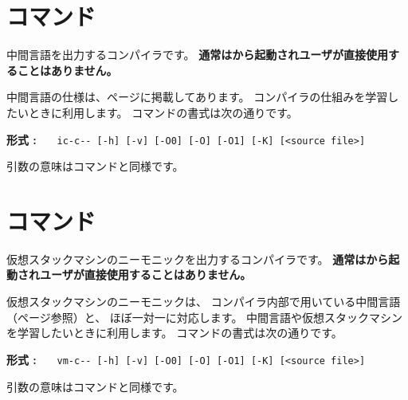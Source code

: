 

\section{{\icmmc}コマンド}
\label{command:icmmc}

中間言語を出力する{\cmm}コンパイラです。
{\bf 通常は{\cmi}から起動されユーザが直接使用することはありません。}

中間言語の仕様は、\pageref{app:vm}ページに掲載してあります。
コンパイラの仕組みを学習したいときに利用します。
{\icmmc}コマンドの書式は次の通りです。

\begin{flushleft}
{\bf 形式 : }~~~\verb/ic-c-- [-h] [-v] [-O0] [-O] [-O1] [-K] [<source file>]/
\end{flushleft}

引数の意味は{\cmmc}コマンドと同様です。

\section{{\vcmmc}コマンド}
\label{command:vcmmc}

仮想スタックマシンのニーモニックを出力する{\cmm}コンパイラです。
{\bf 通常は{\cmv}から起動されユーザが直接使用することはありません。}

仮想スタックマシンのニーモニックは、
コンパイラ内部で用いている中間言語（\pageref{app:vm}ページ参照）と、
ほぼ一対一に対応します。
中間言語や仮想スタックマシンを学習したいときに利用します。
{\vcmmc}コマンドの書式は次の通りです。

\begin{flushleft}
{\bf 形式 : }~~~\verb/vm-c-- [-h] [-v] [-O0] [-O] [-O1] [-K] [<source file>]/
\end{flushleft}

引数の意味は{\cmmc}コマンドと同様です。
%

